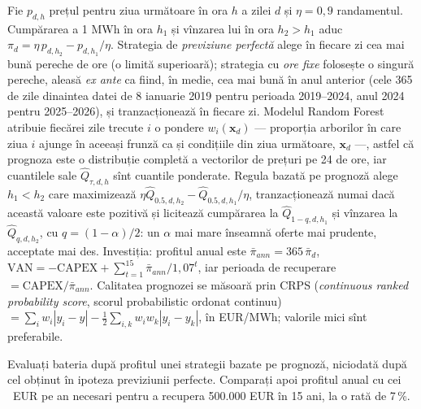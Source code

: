 {Fie $p_{d,h}$ prețul pentru ziua următoare în ora $h$ a zilei $d$ și $\eta=0{,}9$ randamentul. Cumpărarea a 1 MWh în ora $h_1$ și vînzarea lui în ora $h_2>h_1$ aduc $\pi_d=\eta\,p_{d,h_2}-p_{d,h_1}/\eta$.
Strategia de \emph{previziune perfectă} alege în fiecare zi cea mai bună pereche de ore (o limită superioară); strategia cu \emph{ore fixe} folosește o singură pereche, aleasă \emph{ex ante} ca fiind, în medie, cea mai bună în anul anterior (cele 365 de zile dinaintea datei de 8 ianuarie 2019 pentru perioada 2019--2024, anul 2024 pentru 2025--2026), și tranzacționează în fiecare zi.
Modelul Random Forest atribuie fiecărei zile trecute $i$ o pondere $w_i(\mathbf x_d)$ --- proporția arborilor în care ziua $i$ ajunge în aceeași frunză ca și condițiile din ziua următoare, $\mathbf x_d$ ---, astfel că prognoza este o distribuție completă a vectorilor de prețuri pe 24 de ore, iar cuantilele sale $\hat Q_{\tau,d,h}$ sînt cuantile ponderate.
Regula bazată pe prognoză alege $h_1<h_2$ care maximizează $\eta\hat Q_{0.5,d,h_2}-\hat Q_{0.5,d,h_1}/\eta$, tranzacționează numai dacă această valoare este pozitivă și licitează cumpărarea la $\hat Q_{1-q,d,h_1}$ și vînzarea la $\hat Q_{q,d,h_2}$, cu $q=(1-\alpha)/2$: un $\alpha$ mai mare înseamnă oferte mai prudente, acceptate mai des.
Investiția: profitul anual este $\bar\pi_{ann}=365\,\bar\pi_d$, $\mathrm{VAN}=-\mathrm{CAPEX}+\sum_{t=1}^{15}\bar\pi_{ann}/1{,}07^t$, iar perioada de recuperare $=\mathrm{CAPEX}/\bar\pi_{ann}$. Calitatea prognozei se măsoară prin CRPS (\emph{continuous ranked probability score}, scorul probabilistic ordonat continuu) $=\sum_iw_i|y_i-y|-\tfrac12\sum_{i,k}w_iw_k|y_i-y_k|$, în EUR/MWh; valorile mici sînt preferabile.}
\begin{decision}
%
{Evaluați bateria după profitul unei strategii bazate pe prognoză, niciodată după cel obținut în ipoteza previziunii perfecte. Comparați apoi profitul anual cu cei \NneedYear\ EUR pe an necesari pentru a recupera 500.000 EUR în 15 ani, la o rată de 7\,\%.}
\end{decision}

